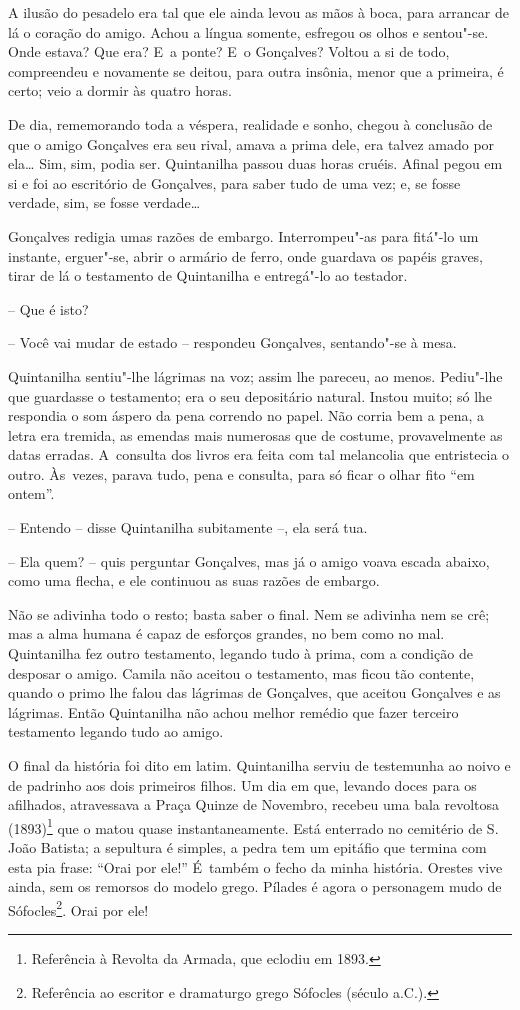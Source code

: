 A ilusão do pesadelo era tal que ele ainda levou as mãos à boca, para
arrancar de lá o coração do amigo. Achou a língua somente, esfregou os
olhos e sentou"-se. Onde estava? Que era? E~a ponte? E~o Gonçalves?
Voltou a si de todo, compreendeu e novamente se deitou, para outra
insônia, menor que a primeira, é certo; veio a dormir às quatro horas.

De dia, rememorando toda a véspera, realidade e sonho, chegou à
conclusão de que o amigo Gonçalves era seu rival, amava a prima dele,
era talvez amado por ela\ldots{} Sim, sim, podia ser. Quintanilha passou duas
horas cruéis. Afinal pegou em si e foi ao escritório de Gonçalves, para
saber tudo de uma vez; e, se fosse verdade, sim, se fosse verdade\ldots{}

Gonçalves redigia umas razões de embargo. Interrompeu"-as para fitá"-lo um
instante, erguer"-se, abrir o armário de ferro, onde guardava os papéis
graves, tirar de lá o testamento de Quintanilha e entregá"-lo ao
testador.

-- Que é isto?

-- Você vai mudar de estado -- respondeu Gonçalves, sentando"-se à mesa.

Quintanilha sentiu"-lhe lágrimas na voz; assim lhe pareceu, ao menos.
Pediu"-lhe que guardasse o testamento; era o seu depositário natural.
Instou muito; só lhe respondia o som áspero da pena correndo no papel.
Não corria bem a pena, a letra era tremida, as emendas mais numerosas
que de costume, provavelmente as datas erradas. A~consulta dos livros
era feita com tal melancolia que entristecia o outro. Às~vezes, parava
tudo, pena e consulta, para só ficar o olhar fito ``em ontem''.

-- Entendo -- disse Quintanilha subitamente --, ela será tua.

-- Ela quem? -- quis perguntar Gonçalves, mas já o amigo voava escada
abaixo, como uma flecha, e ele continuou as suas razões de embargo.

Não se adivinha todo o resto; basta saber o final. Nem se adivinha nem
se crê; mas a alma humana é capaz de esforços grandes, no bem como no
mal. Quintanilha fez outro testamento, legando tudo à prima, com a
condição de desposar o amigo. Camila não aceitou o testamento, mas ficou
tão contente, quando o primo lhe falou das lágrimas de Gonçalves, que
aceitou Gonçalves e as lágrimas. Então Quintanilha não achou melhor
remédio que fazer terceiro testamento legando tudo ao amigo.

O final da história foi dito em latim. Quintanilha serviu de testemunha
ao noivo e de padrinho aos dois primeiros filhos. Um dia em que, levando
doces para os afilhados, atravessava a Praça Quinze de Novembro, recebeu
uma bala revoltosa (1893)\footnote{Referência à Revolta da Armada, que
  eclodiu em 1893.} que o matou quase instantaneamente. Está enterrado
no cemitério de S. João Batista; a sepultura é simples, a pedra tem um
epitáfio que termina com esta pia frase: ``Orai por ele!'' É~também o
fecho da minha história. Orestes vive ainda, sem os remorsos do modelo
grego. Pílades é agora o personagem mudo de Sófocles\footnote{Referência
  ao escritor e dramaturgo grego Sófocles (século  a.C.).}. Orai por
ele!


